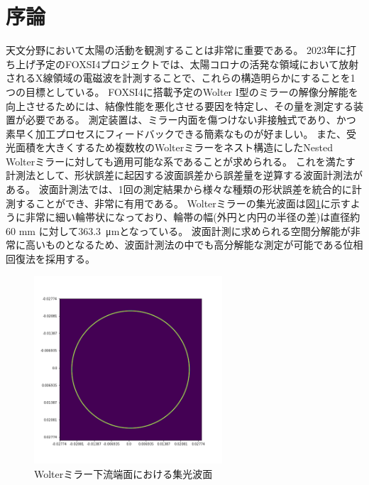 \documentclass[a4j]{jarticle}
\begin{document}

\section{序論}
天文分野において太陽の活動を観測することは非常に重要である。
2023年に打ち上げ予定のFOXSI4プロジェクトでは、太陽コロナの活発な領域において放射されるX線領域の電磁波を計測することで、これらの構造明らかにすることを1つの目標としている。
FOXSI4に搭載予定のWolter I型のミラーの解像分解能を向上させるためには、結像性能を悪化させる要因を特定し、その量を測定する装置が必要である。
測定装置は、ミラー内面を傷つけない非接触式であり、かつ素早く加工プロセスにフィードバックできる簡素なものが好ましい。
また、受光面積を大きくするため複数枚のWolterミラーをネスト構造にしたNested Wolterミラーに対しても適用可能な系であることが求められる。
これを満たす計測法として、形状誤差に起因する波面誤差から誤差量を逆算する波面計測法がある。
波面計測法では、1回の測定結果から様々な種類の形状誤差を統合的に計測することができ、非常に有用である。
Wolterミラーの集光波面は図\ref{fig:wolter_thinring}に示すように非常に細い輪帯状になっており、輪帯の幅(外円と内円の半径の差)は直径約 60 mm に対して\SI{363.3}{\micro \metre}となっている。
波面計測に求められる空間分解能が非常に高いものとなるため、波面計測法の中でも高分解能な測定が可能である位相回復法を採用する。

\begin{figure}[ht!]
\centering
\includegraphics[width=7cm]{../thesis/chap1/figure/wolter_thinring.png}
\caption{Wolterミラー下流端面における集光波面}
\label{fig:wolter_thinring}
\end{figure}
\end{document}
